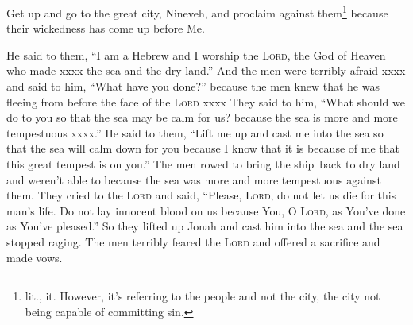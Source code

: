 
\begin{inparaenum}
     Get up and go to the great city, Nineveh, and proclaim against them\footnote{lit., it. However, it's referring to the people and not the city, the city not being capable of committing sin.} because their wickedness has come up before Me.%
    
     He said to them, ``I am a Hebrew and I worship the \textsc{Lord}, the God of Heaven who made xxxx the sea and the dry land.''%
     And the men were terribly afraid xxxx and said to him, ``What have you done?'' because the men knew that he was fleeing from before the face of the \textsc{Lord} xxxx%
     They said to him, ``What should we do to you so that the sea may be calm for us? because the sea is more and more tempestuous xxxx.''%
     He said to them, ``Lift me up and cast me into the sea so that the sea will calm down for you because I know that it is because of me that this great tempest is on you.''%
     The men rowed to bring the ship\understood\ back to dry land and weren't able to because the sea was more and more tempestuous against them.%
     They cried to the \textsc{Lord} and said, ``Please, \textsc{Lord}, do not let us die for this man's life. Do not lay innocent blood on us because You, O \textsc{Lord}, as You've done as You've pleased.''%
     So they lifted up Jonah and cast him into the sea and the sea stopped raging.%
     The men terribly feared the \textsc{Lord} and offered a sacrifice and made vows.%
\end{inparaenum}
